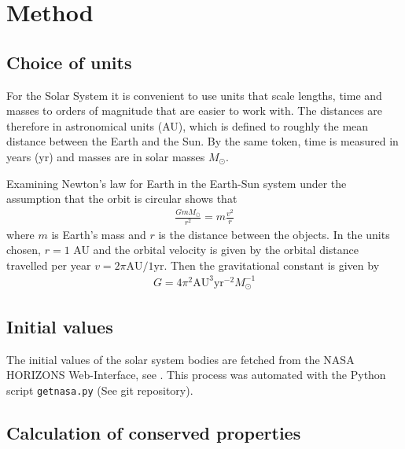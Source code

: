 \documentclass[aps,reprint]{revtex4-1}
\begin{document}
\section{Method}
\label{sec:method}
\subsection{Choice of units}
For the Solar System it is convenient to use units that scale lengths, time and
masses to orders of magnitude that are easier to work with. The distances are
therefore in astronomical units (AU), which is defined to roughly the mean
distance between the Earth and the Sun. By the same token, time is measured in
years (yr) and masses are in solar masses $M_\odot$.

Examining Newton's law for Earth in the Earth-Sun system under the assumption
that the orbit is circular shows that
\begin{align*}
  \frac{GmM_\odot}{r^2} = m \frac{v^2}{r}
\end{align*}
where $m$ is Earth's mass and $r$ is the distance between the objects. In the
units chosen, $r = 1$ AU and the orbital velocity is given by the orbital distance
travelled per year $v = 2\pi \text{AU}/1 \text{yr}$. Then the gravitational
constant is given by
\begin{align}
  G = 4\pi^2 \text{AU}^3 \text{yr}^{-2} M_\odot^{-1}
\end{align}
\subsection{Initial values}
The initial values of the solar system bodies are fetched from the NASA HORIZONS
Web-Interface, see \cite{nasa}. This process was automated with the Python script
\texttt{getnasa.py} (See git repository).
\subsection{Calculation of conserved properties}
\end{document}
